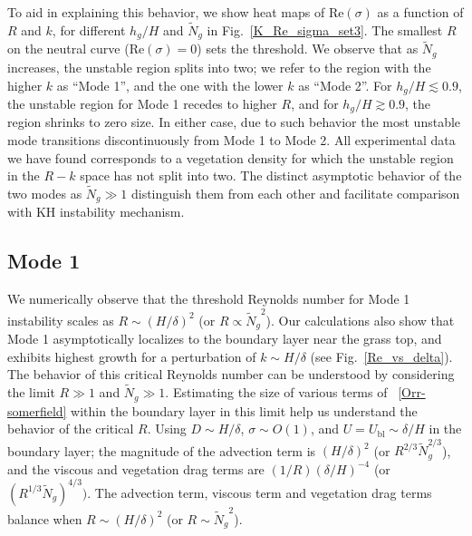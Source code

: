 \documentclass[12pt]{report}   %
\newcommand{\hg}{h_g}
\newcommand{\Rey}{{R}}
\newcommand{\Ndg}{\tilde{N}_g}
\newcommand{\ubl}{U_\text{bl}}
\begin{document}
To aid in explaining this behavior, we show heat maps of Re$(\sigma)$ as a function of $\Rey$ and $k$, for different $\hg/H$ and $\Ndg$ in Fig.~\ref{K_Re_sigma_set3}. 
The smallest $\Rey$ on the neutral curve (Re$(\sigma)=0$) sets the threshold. 
We observe that as $\Ndg$ increases, the unstable region splits into two; we refer to the region with the higher $k$ as ``Mode 1'', and the one with the lower $k$ as ``Mode 2''. 
For $\hg/H\lesssim 0.9$, the unstable region for Mode 1 recedes to higher $\Rey$, and for $\hg/H \gtrsim 0.9$, the region shrinks to zero size.
In either case, due to such behavior the most unstable mode transitions discontinuously from Mode 1 to Mode 2.
All experimental data we have found corresponds to a vegetation density for which the unstable region in the $\Rey-k$ space has not split into two. 
The distinct asymptotic behavior of the two modes as $\Ndg \gg 1$ distinguish them from each other and facilitate comparison with KH instability mechanism.

\subsection{Mode 1}
We numerically observe that the threshold Reynolds number for Mode 1 instability scales as  $\Rey \sim (H/\delta)^2$ (or $\Rey \propto {\Ndg}^{2}$). 
Our calculations also show that Mode 1 asymptotically localizes to the boundary layer near the grass top, and exhibits highest growth for a perturbation of  $k \sim H/\delta$ (see Fig.~\ref{Re_vs_delta}). 
The behavior of this critical Reynolds number can be understood by considering the limit $\Rey \gg 1$ and $\Ndg \gg 1$.
Estimating the size of various terms of ~\eqref{Orr-somerfield} within the boundary layer in this limit help us understand the behavior of the critical $\Rey$. 
Using $D\sim H/\delta$, $\sigma \sim O(1)$, and $U=\ubl \sim \delta/H$ in the boundary layer; the magnitude of the advection term is $ (H/\delta)^2$  (or $\Rey^{2/3} \Ndg^{2/3}$), and the viscous and vegetation drag terms are $(1/\Rey) (\delta/H)^{-4}$ (or $(\Rey^{1/3} \Ndg)^{4/3})$. 
The advection term, viscous term and vegetation drag terms balance when $\Rey \sim (H/\delta)^2$ (or $\Rey \sim {\Ndg}^{2}$).
\end{document}
